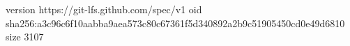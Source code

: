 version https://git-lfs.github.com/spec/v1
oid sha256:a3c96c6f10aabba9aea573c80c67361f5d340892a2b9c51905450cd0e49d6810
size 3107
